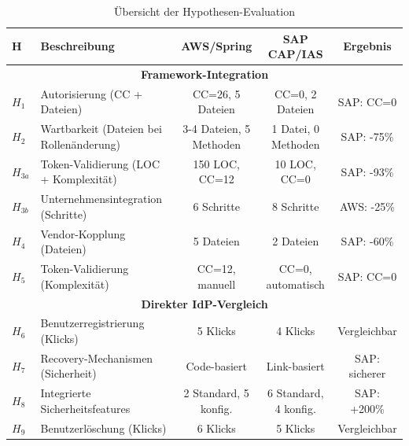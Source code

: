 \begin{table}[h]
    \centering
    \small
    \begin{tabular}{|l|p{4cm}|c|c|c|}
        \hline
        \textbf{H}  & \textbf{Beschreibung} & \textbf{AWS/Spring}      & \textbf{SAP CAP/IAS}    & \textbf{Ergebnis} \\
        \hline
        \multicolumn{5}{|c|}{\textbf{Framework-Integration}}                                                                           \\
        \hline
        $H_1$ & Autorisierung (CC + Dateien)  & CC=26, 5 Dateien          & CC=0, 2 Dateien & SAP: CC=0        \\
        \hline
        $H_2$ & Wartbarkeit (Dateien bei Rollenänderung)  & 3-4 Dateien, 5 Methoden  & 1 Datei, 0 Methoden     & SAP: -75\%        \\
        \hline
        $H_{3a}$  & Token-Validierung (LOC + Komplexität) & 150 LOC, CC=12           & 10 LOC, CC=0            & SAP: -93\%        \\
        \hline
        $H_{3b}$  & Unternehmensintegration (Schritte)  & 6 Schritte                     & 8 Schritte                    & AWS: -25\%              \\
        \hline
        $H_4$ & Vendor-Kopplung (Dateien) & 5 Dateien                & 2 Dateien               & SAP: -60\%        \\
        \hline
        $H_5$ & Token-Validierung (Komplexität) & CC=12, manuell           & CC=0, automatisch       & SAP: CC=0         \\
        \hline
        \multicolumn{5}{|c|}{\textbf{Direkter IdP-Vergleich}}                                                                          \\
        \hline
        $H_6$ & Benutzerregistrierung (Klicks)  & 5 Klicks                     & 4 Klicks                    & Vergleichbar              \\
        \hline
        $H_7$ & Recovery-Mechanismen (Sicherheit) & Code-basiert             & Link-basiert            & SAP: sicherer              \\
        \hline
        $H_8$ & Integrierte Sicherheitsfeatures & 2 Standard, 5 konfig.                     & 6 Standard, 4 konfig.                    & SAP: +200\%              \\
        \hline
        $H_9$ & Benutzerlöschung (Klicks) & 6 Klicks                     & 5 Klicks                    & Vergleichbar              \\
        \hline
    \end{tabular}
    \caption{Übersicht der Hypothesen-Evaluation}
    \label{tab:hypothesen_uebersicht}
\end{table}


